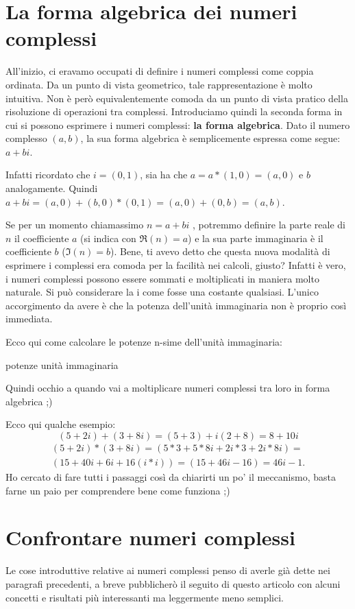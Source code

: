 \section{La forma algebrica dei numeri complessi}
All'inizio, ci eravamo occupati di definire i numeri complessi come coppia ordinata. Da un punto di vista geometrico, tale rappresentazione è molto intuitiva. Non è però equivalentemente comoda da un punto di vista pratico della risoluzione di operazioni tra complessi. Introduciamo quindi la seconda forma in cui si possono esprimere i numeri complessi: \textbf{la forma algebrica}. Dato il numero complesso $ (a,b) $, la sua forma algebrica è semplicemente espressa come segue: $ a+bi $.

Infatti ricordato che $ i=(0,1) $, sia ha che $ a = a*(1,0) = (a,0) $ e $ b $ analogamente.
Quindi $ a+bi=(a,0) + (b,0)*(0,1) = (a,0) + (0,b) = (a,b) $.

Se per un momento chiamassimo $ n = a+bi $ , potremmo definire la parte reale di $ n $ il coefficiente $ a $ (si indica con $ \Re(n)=a $) e la sua parte immaginaria è il coefficiente $ b $ ($ \Im(n)=b $).
Bene, ti avevo detto che questa nuova modalità di esprimere i complessi era comoda per la facilità nei calcoli, giusto?
Infatti è vero, i numeri complessi possono essere sommati e moltiplicati in maniera molto naturale. Si può considerare la i come fosse una costante qualsiasi. L'unico accorgimento da avere è che la potenza dell'unità immaginaria non è proprio così immediata.

Ecco qui come calcolare le potenze n-sime dell'unità immaginaria:

potenze unità immaginaria

Quindi occhio a quando vai a moltiplicare numeri complessi tra loro in forma algebrica ;)

Ecco qui qualche esempio:
\[(5+2i) + (3+8i) = (5+3)+i(2+8) = 8 + 10i\]
\begin{align*}
	(5+2i)*(3+8i) = (5*3 + 5*8i + 2i*3 + 2i*8i ) = \\
	(15 + 40i + 6i +16(i*i))=(15 + 46i -16) = 46i - 1.
\end{align*}
Ho cercato di fare tutti i passaggi così da chiarirti un po' il meccanismo, basta farne un paio per comprendere bene come funziona ;)
\section{Confrontare numeri complessi}
Le cose introduttive relative ai numeri complessi penso di averle già dette nei paragrafi precedenti, a breve pubblicherò il seguito di questo articolo con alcuni concetti e risultati più interessanti ma leggermente meno semplici.

